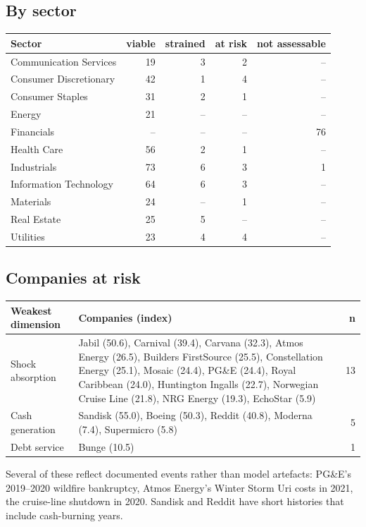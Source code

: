 \documentclass[11pt,a4paper]{article}
\begin{document}
\subsection{By sector}
\begin{center}\small
\begin{tabular}{@{}lrrrr@{}}
\toprule
Sector & viable & strained & at risk & not assessable \\
\midrule
Communication Services & 19 & 3 & 2 & -- \\
Consumer Discretionary & 42 & 1 & 4 & -- \\
Consumer Staples & 31 & 2 & 1 & -- \\
Energy & 21 & -- & -- & -- \\
Financials & -- & -- & -- & 76 \\
Health Care & 56 & 2 & 1 & -- \\
Industrials & 73 & 6 & 3 & 1 \\
Information Technology & 64 & 6 & 3 & -- \\
Materials & 24 & -- & 1 & -- \\
Real Estate & 25 & 5 & -- & -- \\
Utilities & 23 & 4 & 4 & -- \\
\bottomrule
\end{tabular}
\end{center}

\subsection{Companies at risk}
\begin{center}\small
\begin{tabularx}{\linewidth}{@{}lLr@{}}
\toprule
Weakest dimension & Companies (index) & n \\
\midrule
Shock absorption & Jabil (50.6), Carnival (39.4), Carvana (32.3), Atmos Energy (26.5), Builders FirstSource (25.5), Constellation Energy (25.1), Mosaic (24.4), PG\&E (24.4), Royal Caribbean (24.0), Huntington Ingalls (22.7), Norwegian Cruise Line (21.8), NRG Energy (19.3), EchoStar (5.9) & 13 \\
Cash generation & Sandisk (55.0), Boeing (50.3), Reddit (40.8), Moderna (7.4), Supermicro (5.8) & 5 \\
Debt service & Bunge (10.5) & 1 \\
\bottomrule
\end{tabularx}
\end{center}
Several of these reflect documented events rather than model artefacts: PG\&E's 2019--2020 wildfire bankruptcy, Atmos Energy's Winter Storm Uri costs in 2021, the cruise-line shutdown in 2020. Sandisk and Reddit have short histories that include cash-burning years.
\end{document}

